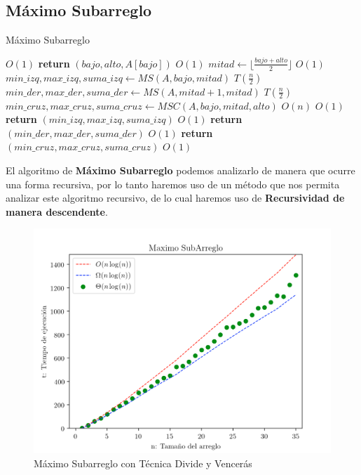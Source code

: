 \documentclass[12pt,twoside]{article}
\begin{document}
\subsection{\textbf{Máximo Subarreglo}}
\begin{algorithm}[h]
  \caption{Máximo Subarreglo}\label{euclid}
  \begin{algorithmic}[1]
                                                                  \Comment $O(1)$
      \State \textbf{return} $(bajo, alto, A[bajo])$                                 \Comment $O(1)$
    \Else
      \State $mitad \gets \lfloor \frac{bajo + alto}{2} \rfloor$                     \Comment $O(1)$
      \State $min\_izq, max\_izq, suma\_izq \gets MS(A,bajo,mitad)$                  \Comment $T(\frac{n}{2})$                                                
      \State $min\_der, max\_der, suma\_der \gets MS(A,mitad + 1,mitad)$             \Comment $T(\frac{n}{2})$  
      \State $min\_cruz, max\_cruz, suma\_cruz \gets MSC(A,bajo,mitad, alto)$        \Comment $O(n)$
                             \Comment $O(1)$
        \State \textbf{return} $(min\_izq,max\_izq,suma\_izq)$                       \Comment $O(1)$
        \State \textbf{return} $(min\_der,max\_der,suma\_der)$                       \Comment $O(1)$
      \Else                    
        \State \textbf{return} $(min\_cruz,max\_cruz,suma\_cruz)$                    \Comment $O(1)$
      \EndIf
    \EndIf
  \EndFunction
  \end{algorithmic}
\end{algorithm}
El algoritmo de \textbf{Máximo Subarreglo} podemos analizarlo de manera que ocurre una forma recursiva, por lo tanto haremos uso de un 
método que nos permita analizar este algoritmo recursivo, de lo cual haremos uso de \textbf{Recursividad de manera descendente}.

\begin{figure}[h]
  \centering
    \includegraphics[height=0.75\textwidth]{Figure3}
  \caption{Máximo Subarreglo con Técnica Divide y Vencerás}
  \label{fig:ejemplo3}
\end{figure}
\end{document}
